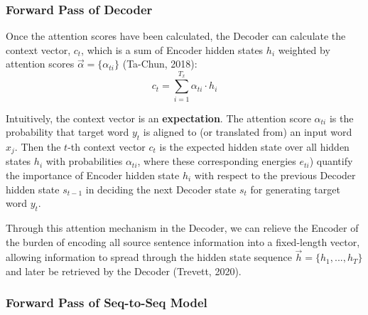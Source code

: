 

\subsubsection{Forward Pass of Decoder}

Once the attention scores have been calculated, the Decoder can calculate the context vector, $c_t$, which is a sum of Encoder hidden states $h_i$ weighted by attention scores $\overrightarrow{\alpha} = \Big \{ \alpha_{ti} \Big \}$ (Ta-Chun, 2018): 
$$
c_t = \sum_{i=1}^{T_x} \alpha_{ti} \cdot h_i
$$

Intuitively, the context vector is an \textbf{expectation}. The attention score $\alpha_{ti}$ is the probability that target word $y_t$ is aligned to (or translated from) an input word $x_j$. Then the $t$-th context vector $c_t$ is the expected hidden state over all hidden states $h_i$ with probabilities $\alpha_{ti}$, where these corresponding energies $e_{ti}$) quantify the importance of Encoder hidden state $h_i$ with respect to the previous Decoder hidden state $s_{t-1}$ in deciding the next Decoder state $s_t$ for generating target word $y_t$.   

Through this attention mechanism in the Decoder, we can relieve the Encoder of the burden of encoding all source sentence information into a fixed-length vector, allowing information to spread through the hidden state sequence $\overrightarrow{h} = \Big \{ h_1,...,h_T\Big \}$ and later be retrieved by the Decoder (Trevett, 2020).  



\subsubsection{Forward Pass of Seq-to-Seq Model}

